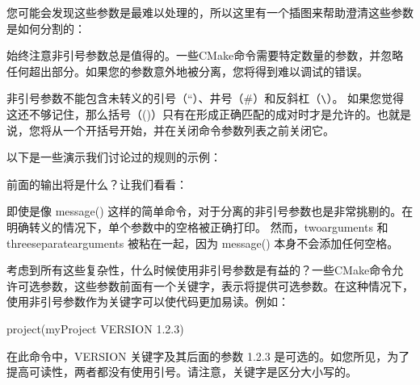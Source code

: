 您可能会发现这些参数是最难以处理的，所以这里有一个插图来帮助澄清这些参数是如何分割的：


始终注意非引号参数总是值得的。一些CMake命令需要特定数量的参数，并忽略任何超出部分。如果您的参数意外地被分离，您将得到难以调试的错误。

非引号参数不能包含未转义的引号（“）、井号（\#）和反斜杠（\verb|\|）。 如果您觉得这还不够记住，那么括号（()）只有在形成正确匹配的成对时才是允许的。也就是说，您将从一个开括号开始，并在关闭命令参数列表之前关闭它。

以下是一些演示我们讨论过的规则的示例：



前面的输出将是什么？让我们看看：


即使是像 message() 这样的简单命令，对于分离的非引号参数也是非常挑剔的。在明确转义的情况下，单个参数中的空格被正确打印。 然而，twoarguments 和 threeseparatearguments 被粘在一起，因为 message() 本身不会添加任何空格。

考虑到所有这些复杂性，什么时候使用非引号参数是有益的？一些CMake命令允许可选参数，这些参数前面有一个关键字，表示将提供可选参数。在这种情况下，使用非引号参数作为关键字可以使代码更加易读。例如：

\begin{cmake}
project(myProject VERSION 1.2.3)
\end{cmake}

在此命令中，VERSION 关键字及其后面的参数 1.2.3 是可选的。如您所见，为了提高可读性，两者都没有使用引号。请注意，关键字是区分大小写的。

